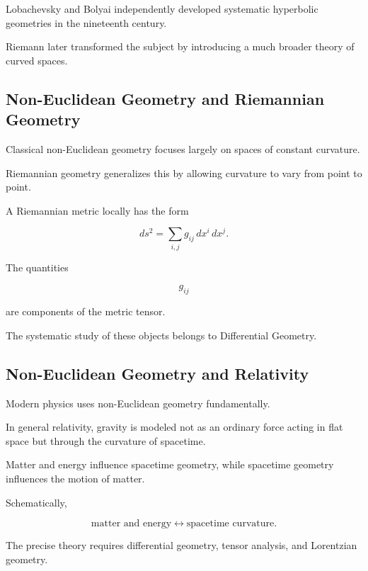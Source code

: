 Lobachevsky and Bolyai independently developed systematic hyperbolic
geometries in the nineteenth century.

Riemann later transformed the subject by introducing a much broader theory
of curved spaces.

\subsection{Non-Euclidean Geometry and Riemannian Geometry}
\label{subsec:non-euclidean-riemannian}

Classical non-Euclidean geometry focuses largely on spaces of constant
curvature.

Riemannian geometry generalizes this by allowing curvature to vary from point
to point.

A Riemannian metric locally has the form

\[
\boxed{
ds^2
=
\sum_{i,j}
g_{ij}\,dx^i\,dx^j.
}
\]

The quantities

\[
g_{ij}
\]

are components of the metric tensor.

The systematic study of these objects belongs to Differential Geometry.

\subsection{Non-Euclidean Geometry and Relativity}
\label{subsec:non-euclidean-relativity}

Modern physics uses non-Euclidean geometry fundamentally.

In general relativity, gravity is modeled not as an ordinary force acting in
flat space but through the curvature of spacetime.

Matter and energy influence spacetime geometry, while spacetime geometry
influences the motion of matter.

Schematically,

\[
\boxed{
\text{matter and energy}
\longleftrightarrow
\text{spacetime curvature}.
}
\]

The precise theory requires differential geometry, tensor analysis, and
Lorentzian geometry.

